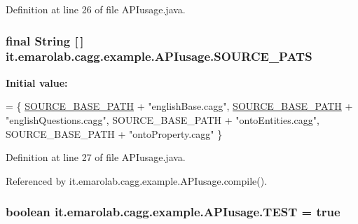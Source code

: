 Definition at line 26 of file A\-P\-Iusage.\-java.

\hypertarget{classit_1_1emarolab_1_1cagg_1_1example_1_1APIusage_a887e583ea89494215f7054a8b52692ca}{
\subsubsection[{S\-O\-U\-R\-C\-E\-\_\-\-P\-A\-T\-S}]{\setlength{\rightskip}{0pt plus 5cm}final String \mbox{[}$\,$\mbox{]} it.\-emarolab.\-cagg.\-example.\-A\-P\-Iusage.\-S\-O\-U\-R\-C\-E\-\_\-\-P\-A\-T\-S\hspace{0.3cm}{\ttfamily [static]}}}\label{classit_1_1emarolab_1_1cagg_1_1example_1_1APIusage_a887e583ea89494215f7054a8b52692ca}
{\bfseries Initial value\-:}
\begin{DoxyCode}
= \{ 
        \hyperlink{classit_1_1emarolab_1_1cagg_1_1example_1_1APIusage_a1c83f94c518dcd58ae612a1ba64b544e}{SOURCE\_BASE\_PATH} + \textcolor{stringliteral}{"englishBase.cagg"},          
      \hyperlink{classit_1_1emarolab_1_1cagg_1_1example_1_1APIusage_a1c83f94c518dcd58ae612a1ba64b544e}{SOURCE\_BASE\_PATH} + \textcolor{stringliteral}{"englishQuestions.cagg"},
        SOURCE\_BASE\_PATH + \textcolor{stringliteral}{"ontoEntities.cagg"},         SOURCE\_BASE\_PATH + \textcolor{stringliteral}{"ontoProperty.cagg"}
    \}
\end{DoxyCode}


Definition at line 27 of file A\-P\-Iusage.\-java.



Referenced by it.\-emarolab.\-cagg.\-example.\-A\-P\-Iusage.\-compile().

\hypertarget{classit_1_1emarolab_1_1cagg_1_1example_1_1APIusage_a5500e480649825534245eec8760bbf32}{
\subsubsection[{T\-E\-S\-T}]{\setlength{\rightskip}{0pt plus 5cm}boolean it.\-emarolab.\-cagg.\-example.\-A\-P\-Iusage.\-T\-E\-S\-T = true\hspace{0.3cm}{\ttfamily [static]}}}\label{classit_1_1emarolab_1_1cagg_1_1example_1_1APIusage_a5500e480649825534245eec8760bbf32}


